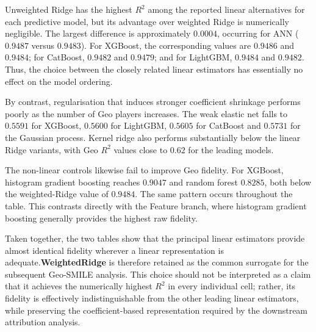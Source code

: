 Unweighted Ridge has the highest $R^2$ among the reported linear alternatives for each predictive model, but its advantage over weighted Ridge is numerically negligible. The largest difference is approximately $0.0004$, occurring for ANN ($0.9487$ versus $0.9483$). For XGBoost, the corresponding values are $0.9486$ and $0.9484$; for CatBoost, $0.9482$ and $0.9479$; and for LightGBM, $0.9484$ and $0.9482$. Thus, the choice between the closely related linear estimators has essentially no effect on the model ordering.

By contrast, regularisation that induces stronger coefficient shrinkage performs poorly as the number of Geo players increases. The weak elastic net falls to $0.5591$ for XGBoost, $0.5600$ for LightGBM, $0.5605$ for CatBoost and $0.5731$ for the Gaussian process. Kernel ridge also performs substantially below the linear Ridge variants, with Geo $R^2$ values close to $0.62$ for the leading models.

The non-linear controls likewise fail to improve Geo fidelity. For XGBoost, histogram gradient boosting reaches $0.9047$ and random forest $0.8285$, both below the weighted-Ridge value of $0.9484$. The same pattern occurs throughout the table. This contrasts directly with the Feature branch, where histogram gradient boosting generally provides the highest raw fidelity.

Taken together, the two tables show that the principal linear estimators provide almost identical fidelity wherever a linear representation is adequate.\textbf{WeightedRidge} is therefore retained as the common surrogate for the subsequent Geo-SMILE analysis. This choice should not be interpreted as a claim that it achieves the numerically highest $R^2$ in every individual cell; rather, its fidelity is effectively indistinguishable from the other leading linear estimators, while preserving the coefficient-based representation required by the downstream attribution analysis.

